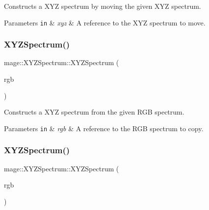 Constructs a X\+YZ spectrum by moving the given X\+YZ spectrum.


\begin{DoxyParams}[1]{Parameters}
\mbox{\tt in}  & {\em xyz} & A reference to the X\+YZ spectrum to move. \\
\hline
\end{DoxyParams}
\hypertarget{structmage_1_1_x_y_z_spectrum_a91cf5d611fbad0e47b6718a04b9a505d}{}\label{structmage_1_1_x_y_z_spectrum_a91cf5d611fbad0e47b6718a04b9a505d} 
\subsubsection{\texorpdfstring{X\+Y\+Z\+Spectrum()}{XYZSpectrum()}\hspace{0.1cm}{\footnotesize\ttfamily [5/8]}}
{\footnotesize\ttfamily mage\+::\+X\+Y\+Z\+Spectrum\+::\+X\+Y\+Z\+Spectrum (\begin{DoxyParamCaption}\item[{const \hyperlink{structmage_1_1_r_g_b_spectrum}{R\+G\+B\+Spectrum} \&}]{rgb }\end{DoxyParamCaption})\hspace{0.3cm}{\ttfamily [explicit]}}

Constructs a X\+YZ spectrum from the given R\+GB spectrum.


\begin{DoxyParams}[1]{Parameters}
\mbox{\tt in}  & {\em rgb} & A reference to the R\+GB spectrum to copy. \\
\hline
\end{DoxyParams}
\hypertarget{structmage_1_1_x_y_z_spectrum_a0bfea768139190f70cfef880d239b20c}{}\label{structmage_1_1_x_y_z_spectrum_a0bfea768139190f70cfef880d239b20c} 
\subsubsection{\texorpdfstring{X\+Y\+Z\+Spectrum()}{XYZSpectrum()}\hspace{0.1cm}{\footnotesize\ttfamily [6/8]}}
{\footnotesize\ttfamily mage\+::\+X\+Y\+Z\+Spectrum\+::\+X\+Y\+Z\+Spectrum (\begin{DoxyParamCaption}\item[{\hyperlink{structmage_1_1_r_g_b_spectrum}{R\+G\+B\+Spectrum} \&\&}]{rgb }\end{DoxyParamCaption})\hspace{0.3cm}{\ttfamily [explicit]}}

